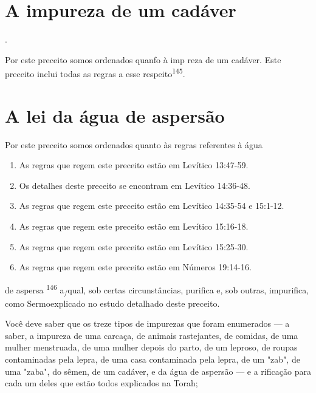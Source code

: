 \begin{itemize}
\begin{enumrate}
\begin{itemize}
\begin{itemize}
\section{A impureza de um cadáver}
.

Por este preceito somos ordenados quanfo à imp reza de um cadá­ver. Este
preceito inclui todas as regras a esse respeito\textsuperscript{145}.

\section{A lei da água de aspersão}

Por este preceito somos ordenados quanto às regras referentes à água

\begin{enumerate}
\def\labelenumi{\arabic{enumi}.}
\setcounter{enumi}{139}
\item
 
 As regras que regem este preceito estão em Levítico 13:47-59.
 
\item
 
 Os detalhes deste preceito se encontram em Levítico 14:36-48.
 
\item
 
 As regras que regem este preceito estão em Levítico 14:35-54 e
 15:1-12.
 
\item
 
 As regras que regem este preceito estão em Levítico 15:16-18.
 
\item
 
 As regras que regem este preceito estão em Levítico 15:25-30.
 
\item
 
 As regras que regem este preceito estão em Números 19:14-16.
 
\end{enumerate}

de aspersa \textsuperscript{146} a\textsubscript{/}qual, sob certas
circunstâncias, purifica e, sob outras, impuri­fica, como Sermoexplicado
no estudo detalhado deste preceito.

Você deve saber que os treze tipos de impurezas que foram enume­rados
--- a saber, a impureza de uma carcaça, de animais rastejantes, de
comi­das, de uma mulher menstruada, de uma mulher depois do parto, de um
lepro­so, de roupas contaminadas pela lepra, de uma casa contaminada
pela lepra, de um "zab", de uma "zaba", do sêmen, de um cadáver, e da
água de aspersão --- e a rificação para cada um deles que estão todos
explicados na Torah;


\end{itemize}
\end{itemize}
\end{enumrate}
\end{itemize}
